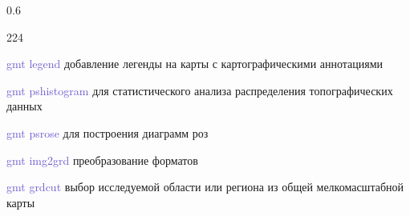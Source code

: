 \documentclass[pdflatex,compress,8pt,
	xcolor={dvipsnames,dvipsnames,svgnames,x11names,table},
	hyperref={colorlinks = true, breaklinks = true, urlcolor = NavyBlue, linkcolor=white, breaklinks = true}]{beamer}
\begin{document}
\begin{frame}
\begin{minipage}[0.4\textheight]{\textwidth}
\begin{columns}[T]
\begin{column}{0.6\textwidth}
\begin{dinglist}{224}
		\item  \textcolor{SlateBlue}{gmt legend} добавление легенды на карты с картографическими аннотациями
		\item  \textcolor{SlateBlue}{gmt pshistogram} для статистического анализа распределения топографических данных
		\item  \textcolor{SlateBlue}{gmt psrose} для построения диаграмм роз
		\item  \textcolor{SlateBlue}{gmt img2grd} преобразование форматов
		\item  \textcolor{SlateBlue}{gmt grdcut} выбор исследуемой области или региона из общей мелкомасштабной карты
	 \end{dinglist}
\end{column}
\end{columns}
\end{minipage}
\end{frame}

\end{document}
